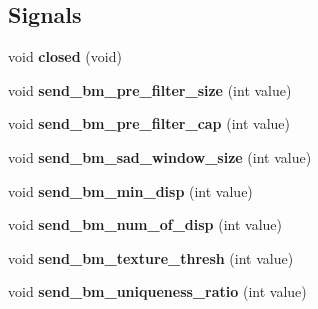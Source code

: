 \subsection*{Signals}
\begin{DoxyCompactItemize}
\item 
\hypertarget{classstereo_match_param_form_af74acd5ac2278ab32913a108598c90bd}{}void {\bfseries closed} (void)\label{classstereo_match_param_form_af74acd5ac2278ab32913a108598c90bd}

\item 
\hypertarget{classstereo_match_param_form_a03eada5faaf2eab6e9a42f7234d92d7d}{}void {\bfseries send\+\_\+bm\+\_\+pre\+\_\+filter\+\_\+size} (int value)\label{classstereo_match_param_form_a03eada5faaf2eab6e9a42f7234d92d7d}

\item 
\hypertarget{classstereo_match_param_form_adb4aa9b2c117dbbf8afeeaac9d65915c}{}void {\bfseries send\+\_\+bm\+\_\+pre\+\_\+filter\+\_\+cap} (int value)\label{classstereo_match_param_form_adb4aa9b2c117dbbf8afeeaac9d65915c}

\item 
\hypertarget{classstereo_match_param_form_a58688d07ecca1a803a14565a5ce70acd}{}void {\bfseries send\+\_\+bm\+\_\+sad\+\_\+window\+\_\+size} (int value)\label{classstereo_match_param_form_a58688d07ecca1a803a14565a5ce70acd}

\item 
\hypertarget{classstereo_match_param_form_a039af2fe00eacb179cb159a4246393d9}{}void {\bfseries send\+\_\+bm\+\_\+min\+\_\+disp} (int value)\label{classstereo_match_param_form_a039af2fe00eacb179cb159a4246393d9}

\item 
\hypertarget{classstereo_match_param_form_a15f1eea232d561b531b625f81567d65b}{}void {\bfseries send\+\_\+bm\+\_\+num\+\_\+of\+\_\+disp} (int value)\label{classstereo_match_param_form_a15f1eea232d561b531b625f81567d65b}

\item 
\hypertarget{classstereo_match_param_form_aa9bb10b9ecf3e2ff541269f8ce478d7c}{}void {\bfseries send\+\_\+bm\+\_\+texture\+\_\+thresh} (int value)\label{classstereo_match_param_form_aa9bb10b9ecf3e2ff541269f8ce478d7c}

\item 
\hypertarget{classstereo_match_param_form_a799a9bd22de77cd222cc9b2e03b3e3b2}{}void {\bfseries send\+\_\+bm\+\_\+uniqueness\+\_\+ratio} (int value)\label{classstereo_match_param_form_a799a9bd22de77cd222cc9b2e03b3e3b2}


\end{DoxyCompactItemize}
